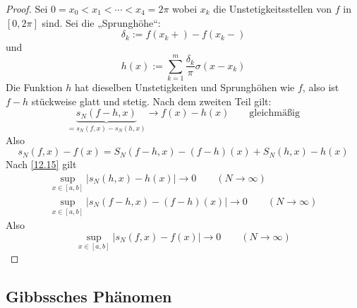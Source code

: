 \documentclass[a4paper,10pt]{scrbook}
\begin{document}
\begin{thm}
\begin{proof}
Sei $ 0=x_0<x_1<\dotsb < x_4=2\pi$ wobei $x_k$ die Unstetigkeitsstellen von $f$ in $[0,2\pi]$ sind.
Sei die „Sprunghöhe“:
\[
\delta_k:=f(x_k+)-f(x_k-)
\]
und
\[
h(x):=\sum_{k=1}^m\frac {\delta_k}\pi \sigma(x-x_k)
\]
Die Funktion $h$ hat dieselben Unstetigkeiten und Sprunghöhen wie $f$, also ist $f-h$ stückweise glatt und stetig.
Nach dem zweiten Teil gilt:
\[
\underbrace{s_N(f-h,x)}_{=s_N(f,x)-s_N(h,x)}\to f(x)-h(x) \qquad \text{gleichmäßig}
\]
Also
\[
s_N(f,x)-f(x) = S_N(f-h,x)-(f-h)(x) + S_N(h,x)-h(x)
\]
Nach \ref{12.15} gilt
\begin{align*}
\sup_{x\in[a,b]}|s_N(h,x)-h(x)|\to 0 \qquad (N\to \infty)\\
\sup_{x\in[a,b]}|s_N(f-h,x)-(f-h)(x)| \to 0 \qquad (N\to \infty)
\end{align*}
Also
\[
\sup_{x\in[a,b]}|s_N(f,x)-f(x)|\to 0\qquad (N\to \infty)
\]
\end{proof}
\end{thm}

\subsection{Gibbssches Phänomen}
\end{document}
